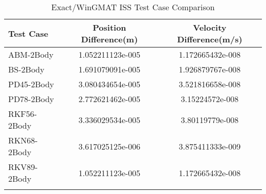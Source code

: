 \begin{table}[htbp!]
\centering
\caption{ Exact/WinGMAT ISS Test Case Comparison}
      \begin{tabular}{lcc}
      \hline\hline
          Test Case & Position Difference(m) & Velocity Difference(m/s) \\
         \hline
         ABM-2Body & 1.052211123e-005 & 1.172665432e-008 \\
         BS-2Body & 1.691079091e-005 & 1.926879767e-008 \\
         PD45-2Body & 3.080434654e-005 & 3.521816658e-008 \\
         PD78-2Body & 2.772621462e-005 & 3.15224572e-008 \\
         RKF56-2Body & 3.336029534e-005 & 3.80119779e-008 \\
         RKN68-2Body & 3.617025125e-006 & 3.875411333e-009 \\
         RKV89-2Body & 1.052211123e-005 & 1.172665432e-008 \\
      \hline\hline
      \label{Table: ISS Exact-WinGMAT Table} 
\end{tabular}
\end{table}
